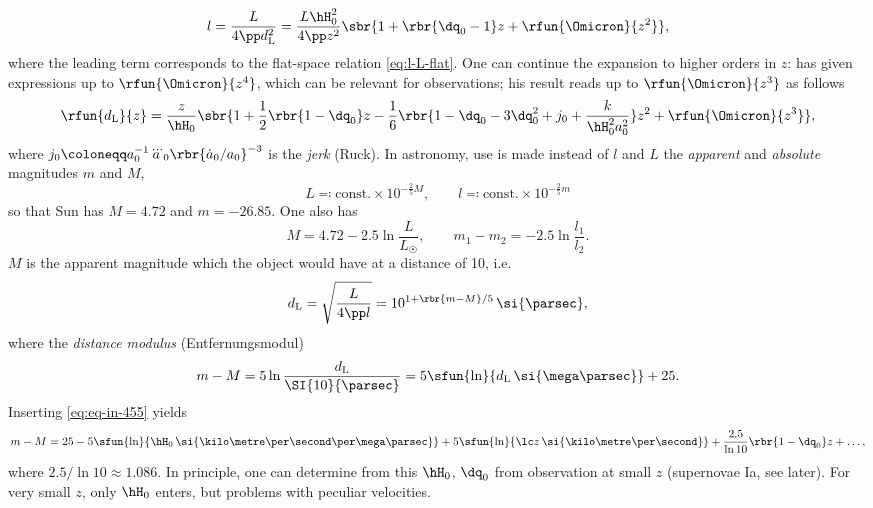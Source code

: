 \begin{equation}
l = \frac{L}{4\pp d_\text{L}^2} = \frac{L \hH_0^2}{4\pp z^2}
\sbr{1 + \rbr{\dq_0 - 1}z + \rfun{\Omicron}{z^2}},
\end{equation}
where the leading term corresponds to the flat-space relation 
\cref{eq:l-L-flat}. One can continue the expansion to higher orders in $z$: 
\cite{Visser2005} has given expressions up to $\rfun{\Omicron}{z^4}$, which can 
be relevant for observations; his result reads up to $\rfun{\Omicron}{z^3}$ as 
follows
\begin{equation}
\rfun{d_\text{L}}{z} = \frac{z}{\hH_0} \sbr{1+\frac{1}{2}\rbr{1-\dq_0}z 
- \frac{1}{6}\rbr{1-\dq_0-3\dq_0^2+j_0+\frac{k}{\hH_0^2 a_0^2}}z^2 + 
\rfun{\Omicron}{z^3}},
\end{equation}
where $j_0 \coloneqq a_0^{-1} \dddot{a}_0\rbr{\dot{a}_0/a_0}^{-3}$ is the 
\emph{jerk} (Ruck). In astronomy, use is made instead of $l$ and $L$ the 
\emph{apparent} and \emph{absolute} magnitudes $m$ and $M$,
\begin{equation}
L \eqqcolon \text{const.}\times 10^{-\frac{2}{5}M},\qquad
l \eqqcolon \text{const.}\times 10^{-\frac{2}{5}m}
\end{equation}
so that Sun has $M = \num{4.72}$ and $m = \num{-26.85}$. One also has
\begin{equation}
M = \num{4.72} - \num{2.5}\ln\frac{L}{L_\astrosun},\qquad
m_1 - m_2 = -\num{2.5}\ln\frac{l_1}{l_2}.
\end{equation}
$M$ is the apparent magnitude which the object would have at a distance of 
\SI{10}{\parsec}, i.e.\ 
\begin{equation}
d_\text{L} = \sqrt{\frac{L}{4\pp l}} = 10^{1+\rbr{m-M}/5}\,\si{\parsec},
\end{equation}
where the \emph{distance modulus} (Entfernungsmodul)
\begin{equation}
m - M = 5\ln\frac{d_\text{L}}{\SI{10}{\parsec}}
= 5\sfun{\ln}{d_\text{L}\,\si{\mega\parsec}} + 25.
\end{equation}
Inserting \cref{eq:eq-in-455} yields
\begin{equation}
m-M = 25-5\sfun{\ln}{\hH_0\,\si{\kilo\metre\per\second\per\mega\parsec}}
+ 5\sfun{\ln}{\lc z\,\si{\kilo\metre\per\second}}
+ \frac{2.5}{\ln 10}\rbr{1-\dq_0} z + \ldots,
\end{equation}
where $2.5/\ln 10 \approx \num{1.086}$. In principle, one can determine from 
this $\hH_0$, $\dq_0$ from observation at small $z$ (supernovae Ia, see later). 
For very small $z$, only $\hH_0$ enters, but problems with peculiar velocities.



